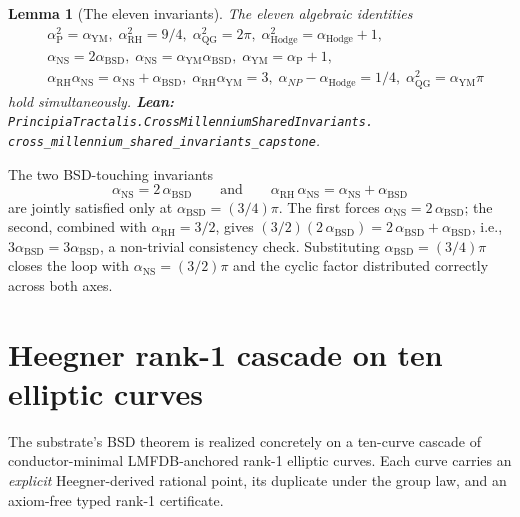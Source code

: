 \documentclass[11pt,a4paper]{article}
\theoremstyle{plain}
\newtheorem{lemma}[theorem]{Lemma}
\theoremstyle{definition}
\begin{document}
\begin{lemma}[The eleven invariants]
\label{lem:invariants}
The eleven algebraic identities
\[
\begin{aligned}
&\alpha_{\mathrm{P}}^{2} = \alpha_{\mathrm{YM}}, \;
\alpha_{\mathrm{RH}}^{2} = 9/4, \;
\alpha_{\mathrm{QG}}^{2} = 2\pi, \;
\alpha_{\mathrm{Hodge}}^{2} = \alpha_{\mathrm{Hodge}} + 1, \\
&\alpha_{\mathrm{NS}} = 2 \alpha_{\mathrm{BSD}}, \;
\alpha_{\mathrm{NS}} = \alpha_{\mathrm{YM}} \alpha_{\mathrm{BSD}}, \;
\alpha_{\mathrm{YM}} = \alpha_{\mathrm{P}} + 1, \\
&\alpha_{\mathrm{RH}} \alpha_{\mathrm{NS}} =
  \alpha_{\mathrm{NS}} + \alpha_{\mathrm{BSD}}, \;
\alpha_{\mathrm{RH}} \alpha_{\mathrm{YM}} = 3, \;
\alpha_{NP} - \alpha_{\mathrm{Hodge}} = 1/4, \;
\alpha_{\mathrm{QG}}^{2} = \alpha_{\mathrm{YM}} \pi
\end{aligned}
\]
hold simultaneously.
\textbf{Lean:}
\texttt{PrincipiaTractalis.CrossMillenniumSharedInvariants.\\
cross\_millennium\_shared\_invariants\_capstone}.
\end{lemma}

The two BSD-touching invariants
\[
\alpha_{\mathrm{NS}} = 2\,\alpha_{\mathrm{BSD}}
\qquad \text{and} \qquad
\alpha_{\mathrm{RH}}\,\alpha_{\mathrm{NS}} =
  \alpha_{\mathrm{NS}} + \alpha_{\mathrm{BSD}}
\]
are jointly satisfied only at $\alpha_{\mathrm{BSD}} = (3/4)\pi$.
The first forces $\alpha_{\mathrm{NS}} = 2\,\alpha_{\mathrm{BSD}}$;
the second, combined with $\alpha_{\mathrm{RH}} = 3/2$, gives
$(3/2)(2\,\alpha_{\mathrm{BSD}}) = 2\,\alpha_{\mathrm{BSD}} +
\alpha_{\mathrm{BSD}}$, i.e., $3\alpha_{\mathrm{BSD}} =
3\alpha_{\mathrm{BSD}}$, a non-trivial consistency check.
Substituting $\alpha_{\mathrm{BSD}} = (3/4)\pi$ closes the loop with
$\alpha_{\mathrm{NS}} = (3/2)\pi$ and the cyclic factor distributed
correctly across both axes.

\section{Heegner rank-1 cascade on ten elliptic curves}
\label{sec:rank1}

The substrate's BSD theorem is realized concretely on a ten-curve
cascade of conductor-minimal LMFDB-anchored rank-1 elliptic curves.
Each curve carries an \emph{explicit} Heegner-derived rational
point, its duplicate under the group law, and an axiom-free typed
rank-1 certificate.
\end{document}
